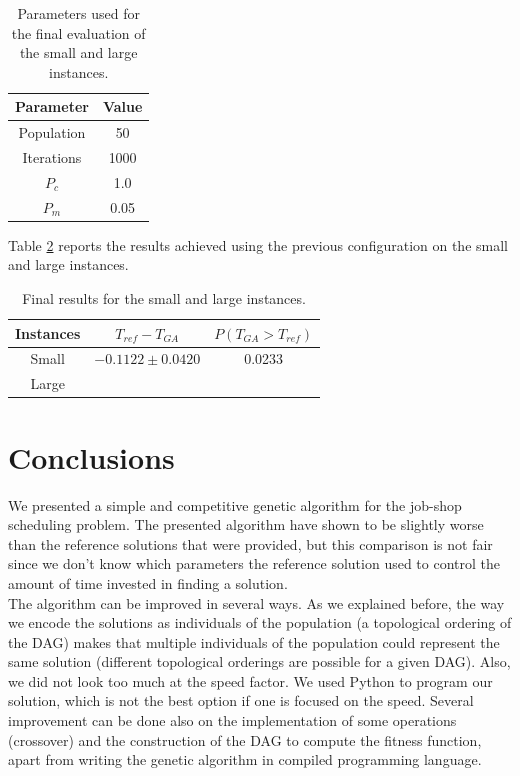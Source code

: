 \documentclass[10pt,a4paper]{article}
\begin{document}
\begin{table}[h]
\centering
\begin{tabular}{|c|c|}
\hline
Parameter & Value \\
\hline
Population &  50\\
Iterations & 1000\\
$P_c$ & 1.0\\
$P_m$ & 0.05\\
\hline
\end{tabular}
\caption{Parameters used for the final evaluation of the small and large instances.}
\label{tab:optimal_params}
\end{table}

Table \ref{tab:final_results} reports the results achieved using the previous configuration on the small and large instances.\\

\begin{table}[h]
\centering
\begin{tabular}{|c|c|c|}
\hline
Instances & $T_{ref} - T_{GA}$ & $P(T_{GA} > T_{ref})$\\
\hline
Small & $-0.1122 \pm 0.0420$ & 0.0233\\ 
Large & & \\
\hline
\end{tabular}
\caption{Final results for the small and large instances.}
\label{tab:final_results}
\end{table}

\section{Conclusions}
We presented a simple and competitive genetic algorithm for the job-shop scheduling problem. The presented algorithm have shown to be slightly worse than the reference solutions that were provided, but this comparison is not fair since we don't know which parameters the reference solution used to control the amount of time invested in finding a solution.\\

The algorithm can be improved in several ways. As we explained before, the way we encode the solutions as individuals of the population (a topological ordering of the DAG) makes that multiple individuals of the population could represent the same solution (different topological orderings are possible for a given DAG). Also, we did not look too much at the speed factor. We used Python to program our solution, which is not the best option if one is focused on the speed. Several improvement can be done also on the implementation of some operations (crossover) and the construction of the DAG to compute the fitness function, apart from writing the genetic algorithm in compiled programming language.



\end{document}
